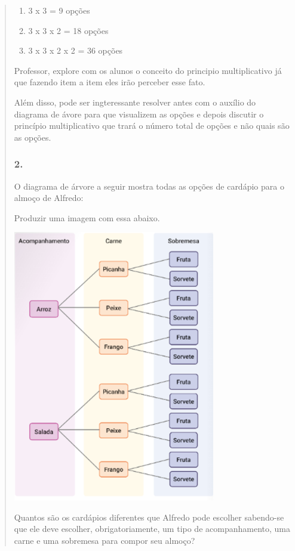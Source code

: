 \begin{enumerate}
\begin{escolha}
\begin{enumerate}
\begin{itemize}
\begin{itemize}
\begin{escolha}
\begin{quote}
\begin{escolha}
{\begin{enumerate}
\def\labelenumi{\alph{enumi})}
\item
  3 x 3 = 9 opções
\item
  3 x 3 x 2 = 18 opções
\item
  3 x 3 x 2 x 2 = 36 opções
\end{enumerate}

Professor, explore com os alunos o conceito do principio multiplicativo
já que fazendo item a item eles irão perceber esse fato.

Além disso, pode ser ingteressante resolver antes com o auxílio do
diagrama de ávore para que visualizem as opções e depois discutir o
princípio multiplicativo que trará o número total de opções e não quais
são as opções.

\subsubsection{2.}\label{section-131}

O diagrama de árvore a seguir mostra todas as opções de cardápio para o
almoço de Alfredo:

Produzir uma imagem com essa abaixo.

\includegraphics[width=3.46697in,height=4.68374in]{media/image138.png}

Quantos são os cardápios diferentes que Alfredo pode escolher sabendo-se
que ele deve escolher, obrigatoriamente, um tipo de acompanhamento, uma
carne e uma sobremesa para compor seu almoço?

}
\end{escolha}
\end{quote}
\end{escolha}
\end{itemize}
\end{itemize}
\end{enumerate}
\end{escolha}
\end{enumerate}
